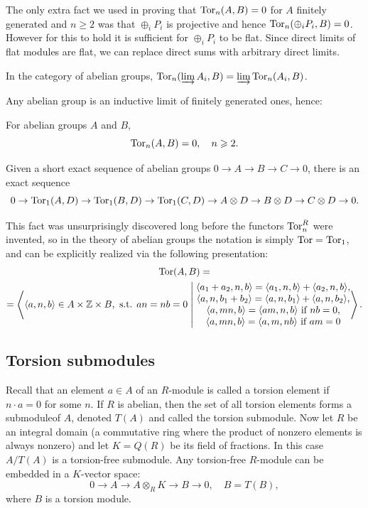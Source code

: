 The only extra fact we used in proving that $\operatorname{Tor}_n(A,B)=0$ for $A$ finitely generated and $n\geq 2$ was that $\oplus_i P_i$ is projective and hence $\operatorname{Tor}_n(\oplus_i P_i,B)=0$. However for this to hold it is sufficient for $\oplus_i P_i$ to be flat. Since direct limits of flat modules are flat, we can replace direct sums with arbitrary direct limits.

\begin{thm} In the category of abelian groups,
    $\operatorname{Tor}_n(\varinjlim A_i,B)=\varinjlim \operatorname{Tor}_n(A_i,B)$.
\end{thm}
Any abelian group is an inductive limit of finitely generated ones, hence:
\begin{cor}
    For abelian groups $A$ and $B$,
    \[\operatorname{Tor}_n(A,B)=0,\quad n\geqslant 2.\]
\end{cor}
\begin{cor}
    Given a short exact sequence of abelian groups $0\to A\to B\to C\to 0$, there is an exact sequence
    \[0\to\operatorname{Tor}_1(A,D)\to \operatorname{Tor}_1(B,D)\to \operatorname{Tor}_1(C,D)\to A\otimes D\to B\otimes D\to C\otimes D\to 0.\]
\end{cor}

This fact was unsurprisingly discovered long before the functors $\operatorname{Tor}_n^R$ were invented, so in the theory of abelian groups the notation is simply $\operatorname{Tor}=\operatorname{Tor}_1$, and can be explicitly realized via the following presentation:
\begin{multline}
    \Tor(A,B)=\\
    =\left\langle \langle a,n,b\rangle\in A\times \bbZ\times B,\text{ s.t. } an=nb=0 
    \middle|
    \begin{matrix}
    \langle a_1+a_2,n,b\rangle= \langle a_1,n,b\rangle+\langle a_2,n,b\rangle,\\
    \langle a,n,b_1+b_2\rangle=\langle a,n,b_1\rangle+\langle a,n,b_2\rangle,\\
    \langle a,mn,b\rangle=\langle am,n,b\rangle \text{ if }nb=0,\\
    \langle a,mn,b\rangle=\langle a,m,nb\rangle \text{ if }am=0
    \end{matrix}
    \right\rangle.
\end{multline}




\subsection{Torsion submodules}

Recall that an element $a\in A$ of an $R$-module is called a torsion element if $n\cdot a=0$ for some $n$. If $R$ is abelian, then the set of all torsion elements forms a submoduleof $A$, denoted $T(A)$ and called the torsion submodule. Now let $R$ be an integral domain (a commutative ring where the product of nonzero elements is always nonzero) and let $K=Q(R)$ be its field of fractions. In this case $A\slash T(A)$ is a torsion-free submodule. Any torsion-free $R$-module can be embedded in a $K$-vector space:
\[0\to A\to A\otimes_R K\to B\to 0,\quad B=T(B),\]
where $B$ is a torsion module.

